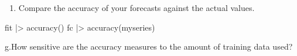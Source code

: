 \documentclass[
  11pt,
]{article}
\newenvironment{Shaded}{\begin{snugshade}}{\end{snugshade}}
\newcommand{\NormalTok}[1]{\textcolor[rgb]{0.00,0.23,0.31}{#1}}
\providecommand{\tightlist}{%
  \setlength{\itemsep}{0pt}\setlength{\parskip}{0pt}}\usepackage{longtable,booktabs,array}
\begin{document}
\begin{enumerate}
\def\labelenumi{\alph{enumi}.}
\setcounter{enumi}{5}
\tightlist
\item
  Compare the accuracy of your forecasts against the actual values.
\end{enumerate}

\begin{Shaded}
\begin{Highlighting}[]
\NormalTok{fit |\textgreater{} accuracy()}
\NormalTok{fc |\textgreater{} accuracy(myseries)}
\end{Highlighting}
\end{Shaded}

g.How sensitive are the accuracy measures to the amount of training data
used?
\end{document}
